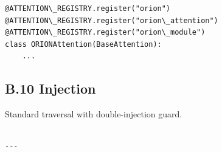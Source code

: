 \begin{lstlisting}
@ATTENTION\_REGISTRY.register("orion")
@ATTENTION\_REGISTRY.register("orion\_attention")
@ATTENTION\_REGISTRY.register("orion\_module")
class ORIONAttention(BaseAttention):
    ...
\end{lstlisting}

\subsection{B.10 Injection}

Standard traversal with double-injection guard.
\begin{lstlisting}

---
\end{lstlisting}